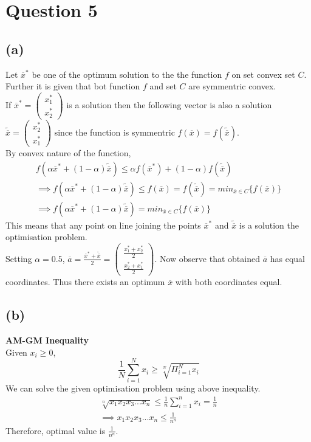 \documentclass{article}
\begin{document}
\section*{\hfil Question 5}
\subsection*{(a)}
Let $\overline{x}^*$ be one of the optimum solution to the the function $f$ on set convex set $C$. Further it is given that bot function $f$ and set $C$ are symmentric convex.\\
If $\overline{x}^* = \begin{pmatrix} x_1^* \\ x_2^* \end{pmatrix}$ is a solution then the following vector is also a solution $\tilde{\overline{x}} = \begin{pmatrix} x_2^* \\ x_1^* \end{pmatrix}$ since the function is symmentric $f(\overline{x}) = f(\tilde{\overline{x}})$.\\
By convex nature of the function,\\
\begin{gather*}
	f(\alpha\overline{x}^* + (1-\alpha)\tilde{\overline{x}}) \le \alpha f(\overline{x}^*) + (1-\alpha)f(\tilde{\overline{x}})\\
	\implies f(\alpha\overline{x}^* + (1-\alpha)\tilde{\overline{x}}) \le f(\overline{x}) = f(\tilde{\overline{x}}) = min_{\overline{x} \in C}\{f(\overline{x})\} \\ 
	\implies f(\alpha\overline{x}^* + (1-\alpha)\tilde{\overline{x}}) = min_{\overline{x} \in C}\{f(\overline{x})\}
\end{gather*}
This means that any point on line joining the points $\overline{x}^*$ and $\tilde{\overline{x}}$ is a solution the optimisation problem.\\
Setting $\alpha = 0.5$, $\overline{a} = \frac{\overline{x}^* + \tilde{\overline{x}}}{2} = \begin{pmatrix} \frac{x_1^* + x_2^*}{2} \\ \frac{x_2^* + x_1^*}{2} \end{pmatrix}$. Now observe that obtained $\overline{a}$ has equal coordinates. Thus there exists an optimum $\overline{x}$ with both coordinates equal.
\subsection*{(b)}
\textbf{AM-GM Inequality}\\
Given $x_i \ge 0$,
\begin{equation*}
	\frac{1}{N}\sum_{i=1}^{N}x_i \ge \sqrt[N]{\Pi _{i=1}^{N}x_i}
\end{equation*}
We can solve the given optimisation problem using above inequality.\\
\begin{gather*}
	\sqrt[n]{x_1x_2x_3...x_n} \le \frac{1}{n}\sum_{i=1}^{n}x_i = \frac{1}{n}\\
	\implies x_1x_2x_3...x_n \le \frac{1}{n^n}
\end{gather*}
Therefore, optimal value is $\frac{1}{n^n}$.
\end{document}

